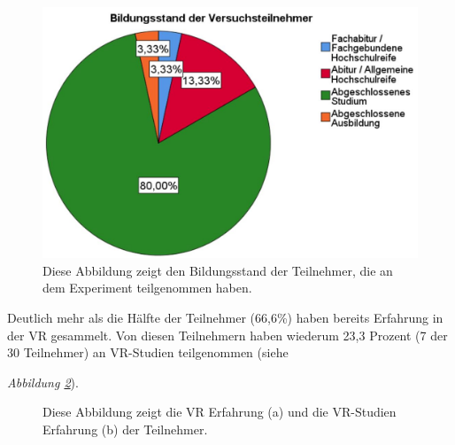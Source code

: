 \documentclass[a4paper,11pt]{article}%
\renewcommand{\\}{\vspace*{0.5\baselineskip} \newline}
\begin{document}
{{{{\begin{figure}[H]
		\begin{footnotesize}
		\centering
			\includegraphics[scale=0.4]{Abbildungen/Demographie/teilnehmerBildungsstand.JPG}
			\caption[Der Bildungsstand der Teilnehmer]{Diese Abbildung zeigt den Bildungsstand der Teilnehmer, die an dem Experiment teilgenommen haben.}
			\label{teilnehmerBildungsstand}
		\end{footnotesize}
	\end{figure}

Deutlich mehr als die Hälfte der Teilnehmer (66,6\%) haben bereits Erfahrung in der VR gesammelt. Von diesen Teilnehmern haben wiederum 23,3 Prozent (7 der 30 Teilnehmer) an VR-Studien teilgenommen (siehe {\textit{Abbildung \ref{teilnehmerVRErfahrungen}}).

\begin{figure}[h]
  \centering
  \qquad
  \caption[Die vorhandene VR-Erfahrung der Teilnehmer]{Diese Abbildung zeigt die VR Erfahrung (a) und die VR-Studien Erfahrung (b) der Teilnehmer.}
  \label{teilnehmerVRErfahrungen}
\end{figure}

}}}}}
\end{document}
